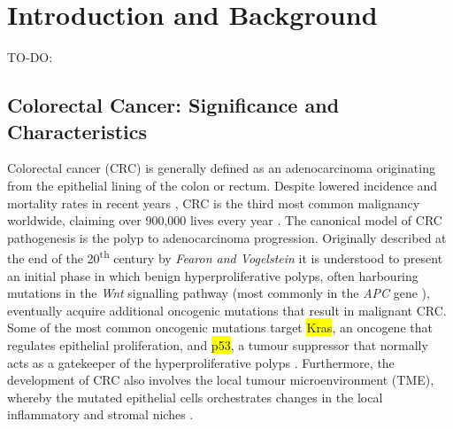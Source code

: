 \chapter{Introduction and Background}
\label{01intro}

TO-DO:













\section{Colorectal Cancer: Significance and Characteristics}

Colorectal cancer (CRC) is generally defined as an adenocarcinoma originating from the epithelial lining of the colon or rectum. Despite lowered incidence and mortality rates in recent years \cite{cronin_annual_2022}, CRC is the third most common malignancy worldwide, claiming over 900,000 lives every year \cite{morgan_global_2023}.
The canonical model of CRC pathogenesis is the polyp to adenocarcinoma progression. Originally described at the end of the 20\textsuperscript{th} century by \emph{Fearon and Vogelstein} \cite{fearon_genetic_1990} it is understood to present an initial phase in which benign hyperproliferative polyps, often harbouring mutations in the \emph{Wnt} signalling pathway (most commonly in the \emph{APC} gene \cite{aghabozorgi_role_2019}), eventually acquire additional oncogenic mutations that result in malignant CRC. Some of the most common oncogenic mutations target \colorbox{yellow}{Kras}, an oncogene that regulates epithelial proliferation, and \colorbox{yellow}{p53}, a tumour suppressor that normally acts as a gatekeeper of the hyperproliferative polyps \cite{fearon_genetic_1990,armaghany_genetic_2012}. Furthermore, the development of CRC also involves the local tumour microenvironment (TME), whereby the mutated epithelial cells orchestrates changes in the local inflammatory and stromal niches \cite{peddareddigari_tumor_2010}.


